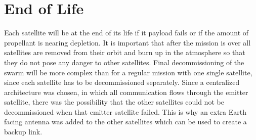 \section{End of Life}
\label{SSEOL}

Each satellite will be at the end of its life if it payload fails or if the amount of propellant is nearing depletion.
It is important that after the mission is over all satellites are removed from their orbit and burn up in the atmosphere so that they do not pose any danger to other satellites.
Final decommissioning of the swarm will be more complex than for a regular mission with one single satellite, since each satellite has to be decommissioned separately.
Since a centralized architecture was chosen, in which all communication flows through the emitter satellite, there was the possibility that the other satellites could not be decommissioned when that emitter satellite failed. This is why an extra Earth facing antenna was added to the other satellites which can be used to create a backup link.